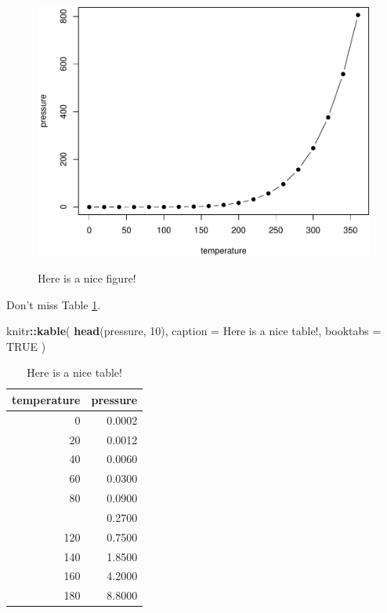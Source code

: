 \documentclass[
]{book}
\newenvironment{Shaded}{\begin{snugshade}}{\end{snugshade}}
\newcommand{\AttributeTok}[1]{\textcolor[rgb]{0.13,0.29,0.53}{#1}}
\newcommand{\ConstantTok}[1]{\textcolor[rgb]{0.56,0.35,0.01}{#1}}
\newcommand{\DecValTok}[1]{\textcolor[rgb]{0.00,0.00,0.81}{#1}}
\newcommand{\FunctionTok}[1]{\textcolor[rgb]{0.13,0.29,0.53}{\textbf{#1}}}
\newcommand{\NormalTok}[1]{#1}
\newcommand{\SpecialCharTok}[1]{\textcolor[rgb]{0.81,0.36,0.00}{\textbf{#1}}}
\newcommand{\StringTok}[1]{\textcolor[rgb]{0.31,0.60,0.02}{#1}}
\begin{document}
\begin{figure}

{\centering \includegraphics[width=0.8\linewidth,alt={Plot with connected points showing that vapor pressure of mercury increases exponentially as temperature increases.}]{_main_files/figure-latex/nice-fig-1} 

}

\caption{Here is a nice figure!}\label{fig:nice-fig}
\end{figure}

Don't miss Table \ref{tab:nice-tab}.

\begin{Shaded}
\begin{Highlighting}[]
\NormalTok{knitr}\SpecialCharTok{::}\FunctionTok{kable}\NormalTok{(}
  \FunctionTok{head}\NormalTok{(pressure, }\DecValTok{10}\NormalTok{), }\AttributeTok{caption =} \StringTok{\textquotesingle{}Here is a nice table!\textquotesingle{}}\NormalTok{,}
  \AttributeTok{booktabs =} \ConstantTok{TRUE}
\NormalTok{)}
\end{Highlighting}
\end{Shaded}

\begin{table}

\caption{\label{tab:nice-tab}Here is a nice table!}
\centering
\begin{tabular}[t]{rr}
\toprule
temperature & pressure\\
\midrule
0 & 0.0002\\
20 & 0.0012\\
40 & 0.0060\\
60 & 0.0300\\
80 & 0.0900\\
\addlinespace
100 & 0.2700\\
120 & 0.7500\\
140 & 1.8500\\
160 & 4.2000\\
180 & 8.8000\\
\bottomrule
\end{tabular}
\end{table}

  
\end{document}
